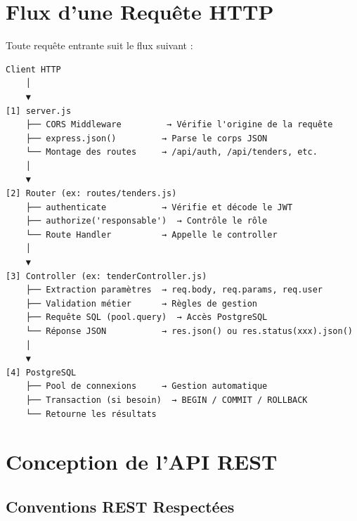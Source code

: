 \documentclass[12pt,a4paper]{report}
\begin{document}
\section{Flux d'une Requête HTTP}

Toute requête entrante suit le flux suivant :

\begin{center}
\begin{verbatim}
Client HTTP
    │
    ▼
[1] server.js
    ├── CORS Middleware         → Vérifie l'origine de la requête
    ├── express.json()         → Parse le corps JSON
    └── Montage des routes     → /api/auth, /api/tenders, etc.
    │
    ▼
[2] Router (ex: routes/tenders.js)
    ├── authenticate           → Vérifie et décode le JWT
    ├── authorize('responsable')  → Contrôle le rôle
    └── Route Handler          → Appelle le controller
    │
    ▼
[3] Controller (ex: tenderController.js)
    ├── Extraction paramètres  → req.body, req.params, req.user
    ├── Validation métier      → Règles de gestion
    ├── Requête SQL (pool.query)  → Accès PostgreSQL
    └── Réponse JSON           → res.json() ou res.status(xxx).json()
    │
    ▼
[4] PostgreSQL
    ├── Pool de connexions     → Gestion automatique
    ├── Transaction (si besoin)  → BEGIN / COMMIT / ROLLBACK
    └── Retourne les résultats
\end{verbatim}
\end{center}

\section{Conception de l'API REST}

\subsection{Conventions REST Respectées}
\end{document}
